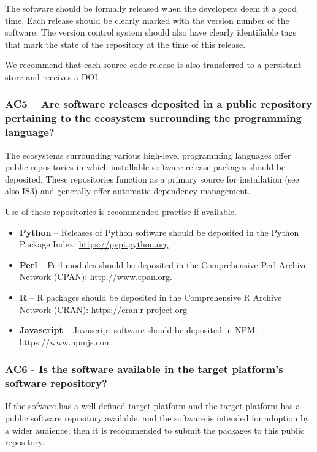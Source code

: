 \documentclass[a4paper,11pt]{article}
\begin{document}
The software should be formally released when the developers deem it a good
time. Each release should be clearly marked with the version number of the software. The version control
system should also have clearly identifiable tags that mark the state of the
repository at the time of this release.

We recommend that each source code release is also transferred to a persistant
store and receives a DOI.

\subsubsection{AC5 -- Are software releases deposited in a public
    repository pertaining to the ecosystem surrounding the programming
language?}

The ecosystems surrounding various high-level programming languages offer
public repositories in which installable software release packages should be
deposited. These repositories function as a primary source for installation (see also
IS3) and generally offer automatic dependency management.

Use of these repositories is recommended practise if available.

\begin{itemize}
    \item \textbf{Python} -- Releases of Python software should be deposited in
        the Python Package Index: \url{https://pypi.python.org}
    \item \textbf{Perl} --  Perl modules should be deposited in the Comprehensive
        Perl Archive Network (CPAN): \url{http://www.cpan.org}.
    \item \textbf{R} -- R packages should be deposited in the Comprehensive R
        Archive Network (CRAN): https://cran.r-project.org
    \item \textbf{Javascript} -- Javascript software should be deposited in
        NPM: https://www.npmjs.com
\end{itemize}

\subsubsection{AC6 - Is the software available in the target platform's software repository?}

If the sofware has a well-defined target platform and the target platform has a
public software repository available, and the software is intended for adoption by a
wider audience; then it is recommended to submit the packages to this public
repository.
\end{document}
